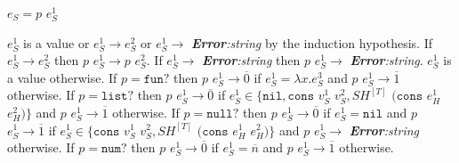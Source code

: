 \begin{case}
$e_{S}=p$ $e_{S}^{1}$

$e_{S}^{1}$ is a value or $e_{S}^{1}\rightarrow e_{S}^{2}$ or $e_{S}^{1}\rightarrow$ \emph{\textbf{Error}:\;string} by the induction hypothesis.  If $e_{S}^{1}\rightarrow e_{S}^{2}$ then $p$ $e_{S}^{1}\rightarrow p$ $e_{S}^{2}$.  If $e_{S}^{1}\rightarrow$ \emph{\textbf{Error}:\;string} then $p$ $e_{S}^{1}\rightarrow$ \emph{\textbf{Error}:\;string}.  $e_{S}^{1}$ is a value otherwise.  If $p=\mathtt{fun?}$ then $p$ $e_{S}^{1}\rightarrow\overline{0}$ if $e_{S}^{1}=\lambda x.e_{S}^{3}$ and $p$ $e_{S}^{1}\rightarrow\overline{1}$ otherwise.  If $p=\mathtt{list?}$ then $p$ $e_{S}^{1}\rightarrow\overline{0}$ if $e_{S}^{1}\in\lbrace\mathtt{nil},\mathtt{cons}$ $v_{S}^{1}$ $v_{S}^{2},SH^{[T]}$ $(\mathtt{cons}$ $e_{H}^{1}$ $e_{H}^{2})\rbrace$ and $p$ $e_{S}^{1}\rightarrow\overline{1}$ otherwise.  If $p=\mathtt{null?}$ then $p$ $e_{S}^{1}\rightarrow\overline{0}$ if $e_{S}^{1}=\mathtt{nil}$ and $p$ $e_{S}^{1}\rightarrow\overline{1}$ if $e_{S}^{1}\in\lbrace\mathtt{cons}$ $v_{S}^{1}$ $v_{S}^{2},SH^{[T]}$ $(\mathtt{cons}$ $e_{H}^{1}$ $e_{H}^{2})\rbrace$ and $p$ $e_{S}^{1}\rightarrow$ \emph{\textbf{Error}:\;string} otherwise.  If $p=\mathtt{num?}$ then $p$ $e_{S}^{1}\rightarrow\overline{0}$ if $e_{S}^{1}=\overline{n}$ and $p$ $e_{S}^{1}\rightarrow\overline{1}$ otherwise.
\end{case}